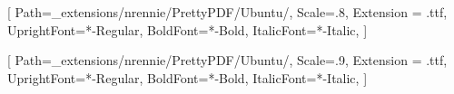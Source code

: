 \makeatletter
\renewcommand{\maketitle}{\bgroup\setlength{\parindent}{0pt}
\begin{flushleft}
  {\sffamily\huge\textbf{\MakeUppercase{\@title}}} \vspace{0.3cm} \newline
  {\Large {\@subtitle}} \newline
  \@author
\end{flushleft}\egroup
}
\makeatother

\setsansfont{Ubuntu}[
    Path=_extensions/nrennie/PrettyPDF/Ubuntu/,
    Scale=.8,
    Extension = .ttf,
    UprightFont=*-Regular,
    BoldFont=*-Bold,
    ItalicFont=*-Italic,
    ]

\setmainfont{Ubuntu}[
    Path=_extensions/nrennie/PrettyPDF/Ubuntu/,
    Scale=.9,
    Extension = .ttf,
    UprightFont=*-Regular,
    BoldFont=*-Bold,
    ItalicFont=*-Italic,
    ]
    
